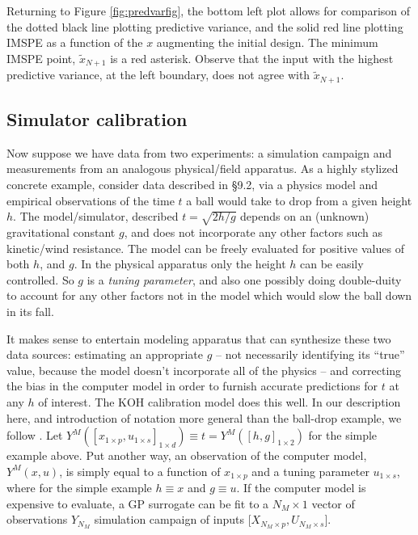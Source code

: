 \documentclass[
]{article}
\begin{document}
Returning to Figure \ref{fig:predvarfig}, the bottom left plot allows for comparison of the dotted black line plotting predictive variance, and the solid red line plotting IMSPE as a function of the \(x\) augmenting the initial design. The minimum IMSPE point, \(\tilde{x}_{N+1}\) is a red asterisk. Observe that the input with the highest predictive variance, at the left boundary, does not agree with \(\tilde{x}_{N+1}\).

\hypertarget{koh}{%
\subsection{Simulator calibration}\label{koh}}

Now suppose we have data from two experiments: a simulation campaign and
measurements from an analogous physical/field apparatus. As a highly stylized
concrete example, consider data described in \citet{gramacy2020surrogates} \S 9.2,
via a physics model and empirical observations of the time \(t\) a ball would
take to drop from a given height \(h\). The model/simulator, described \(t = \sqrt{2h/g}\) depends on an (unknown) gravitational constant \(g\), and does not
incorporate any other factors such as kinetic/wind resistance. The model can
be freely evaluated for positive values of both \(h\), and \(g\). In the physical
apparatus only the height \(h\) can be easily controlled. So \(g\) is a \emph{tuning
parameter}, and also one possibly doing double-duity to account for any other
factors not in the model which would slow the ball down in its fall.

It makes sense
to entertain modeling apparatus that can synthesize these two data sources:
estimating an appropriate \(g\) -- not necessarily identifying its ``true''
value, because the model doesn't incorporate all of the physics -- and
correcting the bias in the computer model in order to furnish accurate
predictions for \(t\) at any \(h\) of interest. The KOH calibration model does
this well. In our description here, and introduction of notation more general
than the ball-drop example, we follow \citet{bayarri2009modularization}. Let \(Y^{M}([x_{1\times p},u_{1\times s}]_{1 \times d}) \equiv t = Y^{M}([h,g]_{1 \times 2})\) for the simple example
above. Put another way, an observation of the computer model, \(Y^M(x,u)\), is simply equal
to a function of \(x_{1 \times p}\) and a tuning
parameter \(u_{1 \times s}\), where for the simple example \(h \equiv x\) and \(g \equiv u\). If the computer model is expensive to evaluate, a GP surrogate can
be fit to a \(N_M \times 1\) vector of observations \(Y_{N_M}\) simulation
campaign of inputs \(\lbrack X_{N_M \times p}, U_{N_M \times s} \rbrack\).
\end{document}
